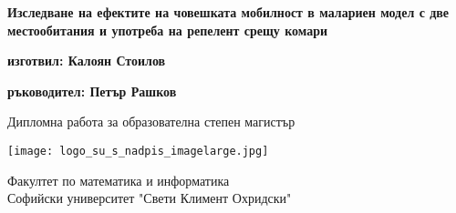 \begin{titlepage}
  \begin{center}
    \vspace*{1cm}

    \Huge
    \textbf{Изследване на ефектите на човешката мобилност в малариен модел с две местообитания и употреба на репелент срещу комари}


    \vspace{1.5cm}

    \textbf{изготвил: Калоян Стоилов}

    \vspace{0.8cm}

    \textbf{ръководител: Петър Рашков}

    \vfill

    Дипломна работа за образователна степен магистър

    \vspace{0.8cm}

    \texttt{[image: logo\_su\_s\_nadpis\_imagelarge.jpg]}

    \Large
    Факултет по математика и информатика\\
    Софийски университет "Свети Климент Охридски"\\

  \end{center}
\end{titlepage}
